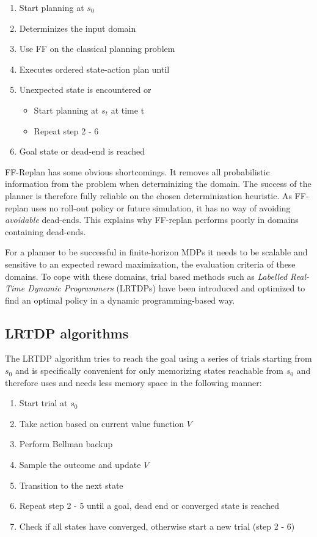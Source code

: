 \documentclass[runningheads,a4paper]{llncs}
\begin{document}
\begin{enumerate}
	\item Start planning at $s_0$
	\item Determinizes the input domain
	\item Use FF on the classical planning problem
	\item Executes ordered state-action plan until
	\item Unexpected state is encountered or
	\begin{itemize}
		\item Start planning at $s_t$ at time t
		\item Repeat step 2 - 6
	\end{itemize}
	\item Goal state or dead-end is reached
\end{enumerate}

FF-Replan has some obvious shortcomings. It removes all probabilistic information from the problem when determinizing the domain. The success of the planner is therefore fully reliable on the chosen determinization heuristic. As FF-replan uses no roll-out policy or future simulation, it has no way of avoiding \emph{avoidable} dead-ends. This explains why FF-replan performs poorly in domains containing dead-ends.

For a planner to be successful in finite-horizon MDPs it needs to be scalable and sensitive to an expected reward maximization, the evaluation criteria of these domains. To cope with these domains, trial based methods such as \emph{Labelled Real-Time Dynamic Programmers} (LRTDPs) have been introduced and optimized to find an optimal policy in a dynamic programming-based way.


\subsection{LRTDP algorithms}

The LRTDP algorithm tries to reach the goal using a series of trials starting from $s_0$ and is specifically convenient for only memorizing states reachable from $s_0$ and therefore uses and needs less memory space in the following manner:

\begin{enumerate}
	\item Start trial at $s_0$
	\item Take action based on current value function $V$
	\item Perform Bellman backup
	\item Sample the outcome and update $V$
	\item Transition to the next state
	\item Repeat step 2 - 5 until a goal, dead end or converged state is reached
	\item Check if all states have converged, otherwise start a new trial (step 2 - 6)
\end{enumerate}
\end{document}
